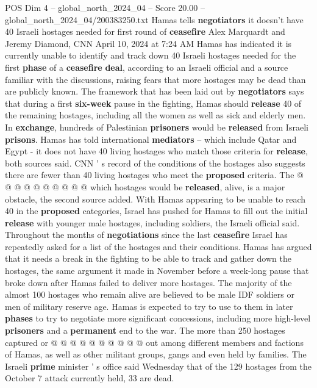 \begin{textsample}{POS Dim 4 – global\_north\_2024\_04 – Score 20.00 – global\_north\_2024\_04/200383250.txt}  \label{ex:f4_pos_364}
Hamas tells \textbf{negotiators} it doesn't have 40 Israeli hostages needed for first round of \textbf{ceasefire} Alex Marquardt and Jeremy Diamond, CNN April 10, 2024 at 7:24 AM Hamas has indicated it is currently unable to identify and track down 40 Israeli hostages needed for the first \textbf{phase} of a \textbf{ceasefire} \textbf{deal}, according to an Israeli official and a source familiar with the discussions, raising fears that more hostages may be dead than are publicly known.
The framework that has been laid out by \textbf{negotiators} says that during a first \textbf{six-week} pause in the fighting, Hamas should \textbf{release} 40 of the remaining hostages, including all the women as well as sick and elderly men.
In \textbf{exchange}, hundreds of Palestinian \textbf{prisoners} would be \textbf{released} from Israeli \textbf{prisons}.
Hamas has told international \textbf{mediators} -- which include Qatar and Egypt - it does not have 40 living hostages who match those criteria for \textbf{release}, both sources said.
CNN ' s record of the conditions of the hostages also suggests there are fewer than 40 living hostages who meet the \textbf{proposed} criteria.
The @ @ @ @ @ @ @ @ @ @ which hostages would be \textbf{released}, alive, is a major obstacle, the second source added.
With Hamas appearing to be unable to reach 40 in the \textbf{proposed} categories, Israel has pushed for Hamas to fill out the initial \textbf{release} with younger male hostages, including soldiers, the Israeli official said.
Throughout the months of \textbf{negotiations} since the last \textbf{ceasefire} Israel has repeatedly asked for a list of the hostages and their conditions.
Hamas has argued that it needs a break in the fighting to be able to track and gather down the hostages, the same argument it made in November before a week-long pause that broke down after Hamas failed to deliver more hostages.
The majority of the almost 100 hostages who remain alive are believed to be male IDF soldiers or men of military reserve age.
Hamas is expected to try to use to them in later \textbf{phases} to try to negotiate more significant concessions, including more high-level \textbf{prisoners} and a \textbf{permanent} end to the war.
The more than 250 hostages captured or @ @ @ @ @ @ @ @ @ @ out among different members and factions of Hamas, as well as other militant groups, gangs and even held by families.
The Israeli \textbf{prime} minister ' s office said Wednesday that of the 129 hostages from the October 7 attack currently held, 33 are dead.

\end{textsample}
